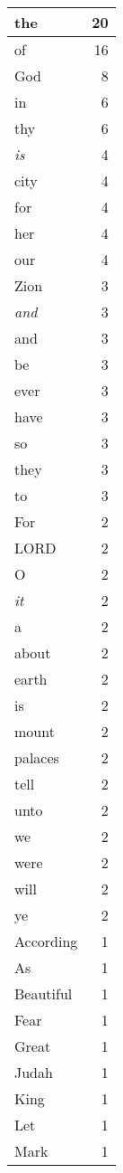 \begin{center}
\begin{longtable}{l|r}
\hline \hline
\endlastfoot
the & 20 \\ \hline
of & 16 \\ \hline
God & 8 \\ \hline
in & 6 \\ \hline
thy & 6 \\ \hline
\emph{is} & 4 \\ \hline
city & 4 \\ \hline
for & 4 \\ \hline
her & 4 \\ \hline
our & 4 \\ \hline
Zion & 3 \\ \hline
\emph{and} & 3 \\ \hline
and & 3 \\ \hline
be & 3 \\ \hline
ever & 3 \\ \hline
have & 3 \\ \hline
so & 3 \\ \hline
they & 3 \\ \hline
to & 3 \\ \hline
For & 2 \\ \hline
LORD & 2 \\ \hline
O & 2 \\ \hline
\emph{it} & 2 \\ \hline
a & 2 \\ \hline
about & 2 \\ \hline
earth & 2 \\ \hline
is & 2 \\ \hline
mount & 2 \\ \hline
palaces & 2 \\ \hline
tell & 2 \\ \hline
unto & 2 \\ \hline
we & 2 \\ \hline
were & 2 \\ \hline
will & 2 \\ \hline
ye & 2 \\ \hline
According & 1 \\ \hline
As & 1 \\ \hline
Beautiful & 1 \\ \hline
Fear & 1 \\ \hline
Great & 1 \\ \hline
Judah & 1 \\ \hline
King & 1 \\ \hline
Let & 1 \\ \hline
Mark & 1 \\ \hline

\end{longtable}
\end{center}
